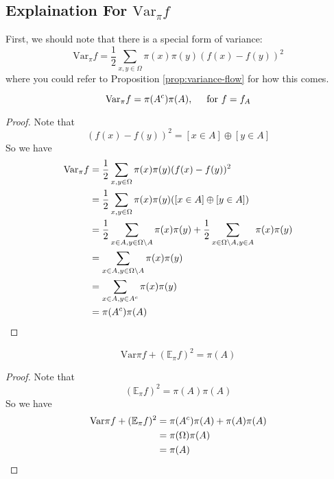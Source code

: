 \subsection{Explaination For $\mathrm{Var}_\pi f$}
First, we should note that there is a special form of variance:
\[\mathrm{Var}_\pi f = \frac{1}{2} \sum_{x, y\in\Omega} \pi(x)\pi(y)(f(x) - f(y))^2\]
where you could refer to Proposition \ref{prop:variance-flow} for how this comes.
\begin{lemma}
  \[\mathrm{Var}_\pi f = \pi(A^c)\pi(A), \hspace{0.5cm} \mbox{for $f = f_A$} \]
\end{lemma}
\begin{proof}
  Note that
  \[(f(x) - f(y))^2 = [x\in A]\oplus[y\in A]\]
  So we have
  \begin{align*}
    \mathrm{Var}_\pi f &= \frac{1}{2}\sum_{x, y\in\Omega} \pi(x)\pi(y)(f(x) - f(y))^2 \\
    &= \frac{1}{2}\sum_{x, y\in\Omega} \pi(x)\pi(y) ([x\in A]\oplus[y\in A]) \\
    &= \frac{1}{2}\sum_{x\in A, y\in\Omega\setminus A} \pi(x)\pi(y) + \frac{1}{2}\sum_{x\in\Omega\setminus A, y\in A} \pi(x)\pi(y) \\
    &= \sum_{x\in A, y\in\Omega\setminus A} \pi(x)\pi(y) \\
    &= \sum_{x\in A, y\in A^c} \pi(x)\pi(y) \\
    &= \pi(A^c)\pi(A) \qedhere
  \end{align*}
\end{proof}
\begin{corollary}
  \[\mathrm{Var}\pi f + (\mathbb{E}_\pi f)^2 = \pi(A)\]
\end{corollary}
\begin{proof}
  Note that
  \[(\mathbb{E}_\pi f)^2 = \pi(A)\pi(A)\]
  So we have
  \begin{align*}
    \mathrm{Var}\pi f + (\mathbb{E}_\pi f)^2 &= \pi(A^c)\pi(A) + \pi(A)\pi(A) \\
    &= \pi(\Omega)\pi(A) \\
    &= \pi(A) \qedhere
  \end{align*}
\end{proof}

